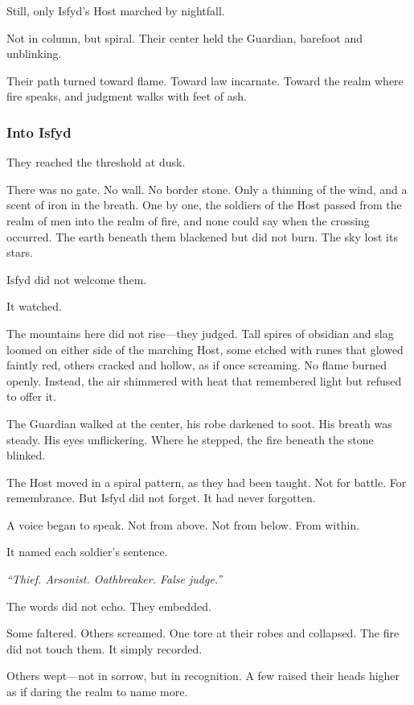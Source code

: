 \documentclass[12pt]{article}
\begin{document}
Still, only Isfyd’s Host marched by nightfall.

Not in column, but spiral. Their center held the Guardian, barefoot and unblinking.

Their path turned toward flame. Toward law incarnate. Toward the realm where fire speaks, and judgment walks with feet of ash.

\dotfill

\subsubsection{Into Isfyd}

They reached the threshold at dusk.

There was no gate. No wall. No border stone. Only a thinning of the wind, and a scent of iron in the breath. One by one, the soldiers of the Host passed from the realm of men into the realm of fire, and none could say when the crossing occurred. The earth beneath them blackened but did not burn. The sky lost its stars.

Isfyd did not welcome them.

It watched.

The mountains here did not rise—they judged. Tall spires of obsidian and slag loomed on either side of the marching Host, some etched with runes that glowed faintly red, others cracked and hollow, as if once screaming. No flame burned openly. Instead, the air shimmered with heat that remembered light but refused to offer it.

The Guardian walked at the center, his robe darkened to soot. His breath was steady. His eyes unflickering. Where he stepped, the fire beneath the stone blinked.

The Host moved in a spiral pattern, as they had been taught. Not for battle. For remembrance. But Isfyd did not forget. It had never forgotten.

A voice began to speak. Not from above. Not from below. From within.

It named each soldier’s sentence.

\textit{``Thief. Arsonist. Oathbreaker. False judge.''}

The words did not echo. They embedded.

Some faltered. Others screamed. One tore at their robes and collapsed. The fire did not touch them. It simply recorded.

Others wept—not in sorrow, but in recognition. A few raised their heads higher as if daring the realm to name more.
\end{document}
